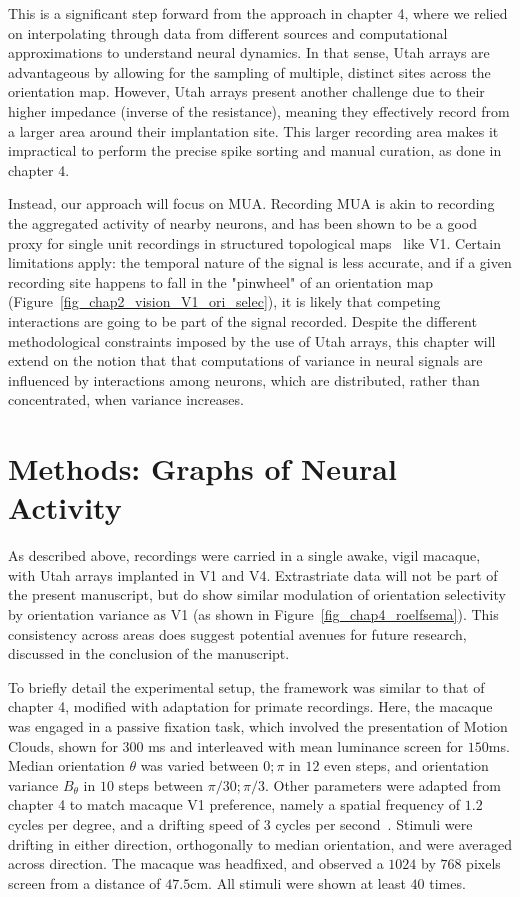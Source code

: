 This is a significant step forward from the approach in chapter 4, where we relied on interpolating through data from different sources and computational approximations to understand neural dynamics. In that sense, Utah arrays are advantageous by allowing for the sampling of multiple, distinct sites across the orientation map. However, Utah arrays present another challenge  due to their higher impedance (inverse of the resistance), meaning they effectively record from a larger area around their implantation site. This larger recording area makes it impractical to perform the precise spike sorting and manual curation, as done in chapter 4.

Instead, our approach will focus on \gls{MUA}. Recording \gls{MUA} is akin to recording the aggregated activity of nearby neurons, and has been shown to be a good proxy for single unit recordings in structured topological maps~\cite{bondy2018feedback, ni2018learning,lange2023weak} like \gls{V1}. Certain limitations apply: the temporal nature of the signal is less accurate, and if a given recording site happens to fall in the "pinwheel" of an orientation map (Figure~\ref{fig_chap2_vision_V1_ori_selec}), it is likely that competing interactions are going to be part of the signal recorded. Despite the different methodological constraints imposed by the use of Utah arrays, this chapter will extend on the notion that that computations of variance in neural signals are influenced by interactions among neurons, which are distributed, rather than concentrated, when variance increases. 



\section{Methods: Graphs of Neural Activity}
As described above, recordings were carried in a single awake, vigil macaque, with Utah arrays implanted in \gls{V1} and V4. Extrastriate data will not be part of the present manuscript, but do show similar modulation of orientation selectivity by orientation variance as \gls{V1} (as shown in Figure~\ref{fig_chap4_roelfsema}). This consistency across areas does suggest potential avenues for future research, discussed in the conclusion of the manuscript. 

To briefly detail the experimental setup, the framework was similar to that of chapter 4, modified with adaptation for primate recordings. Here, the macaque was engaged in a passive fixation task, which involved the presentation of Motion Clouds, shown for $300$ ms and interleaved with mean luminance screen for $150$ms. Median orientation $\theta$ was varied between $0;\pi$ in $12$ even steps, and orientation variance $B_\theta$ in $10$ steps between $\pi/30;\pi/3$. Other parameters were adapted from chapter 4 to match macaque \gls{V1} preference, namely a spatial frequency of $1.2$ cycles per degree, and a drifting speed of $3$ cycles per second~\cite{priebe2006tuning}. Stimuli were drifting in either direction, orthogonally to median orientation, and were averaged across direction. The macaque was headfixed, and observed a $1024$ by $768$ pixels screen from a distance of $47.5$cm. All stimuli were shown at least $40$ times. 

